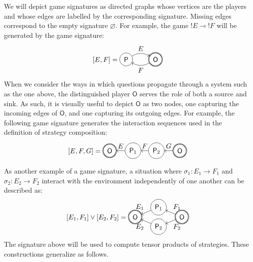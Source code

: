 \documentclass[sigplan,10pt,review,anonymous]{acmart}
\newcommand{\kw}[1]{\ensuremath{ \mathsf{#1} }}
\begin{document}
We will depict game signatures as directed graphs
whose vertices are the players and
whose edges are labelled by the corresponding signature.
Missing edges correspond to the empty signature $\varnothing$.
For example,
the game ${!E} \multimap {!F}$ will be generated by
the game signature:
\[
  [E,F] =
  \begin{tikzpicture}[baseline=(O.base),scale=1.5]
    \node[circle,draw,double] (O) at (0,0) {$\kw{O}$};
    \node[circle,draw] (P) at (-1,0) {$\kw{P}$};
    \path[->] (P) edge[bend left] node[above] {$E$} (O);
    \path[->] (O) edge[bend left] node[below] {$F$} (P);
  \end{tikzpicture}
\]
When we consider the ways in which questions propagate
through a system such as the one above,
the distinguished player $\kw{O}$ serves the role
of both a source and sink.
As such, it is visually useful
to depict $\kw{O}$ as two nodes,
one capturing the incoming edges of $\kw{O}$, and
one capturing its outgoing edges.
For example,
the following game signature
generates the interaction sequences
used in the definition of
strategy composition:
\[
  [E,F,G] =
  \begin{tikzpicture}[baseline=(O1.base),scale=1.2]
    \node[circle,double,draw] (O1) at (0,0) {$\kw{O}$};
    \node[circle,draw] (P1) at (-1,0) {$\kw{P}_2$};
    \node[circle,draw] (P2) at (-2,0) {$\kw{P}_1$};
    \node[circle,double,draw] (O2) at (-3,0) {$\kw{O}$};
    \path[->] (O1) edge node[above] {$G$} (P1);
    \path[->] (P1) edge node[above] {$F$} (P2);
    \path[->] (P2) edge node[above] {$E$} (O2);
  \end{tikzpicture}
\]

As another example of a game signature,
a situation where
$\sigma_1 : E_1 \rightarrow F_1$ and
$\sigma_2 : E_2 \rightarrow F_2$
interact with the environment
independently of one another
can be described as:
\[
  [E_1,F_1] \vee [E_2,F_2] =
  \begin{tikzpicture}[baseline=(O.base),xscale=1.2]
    \node[circle,draw,double] (O1) at (+1,0) {$\kw{O}$};
    \node[circle,draw,double] (O2) at (-1,0) {$\kw{O}$};
    \node[circle,draw] (P1) at (0,+0.5) {$\kw{P}_1$};
    \node[circle,draw] (P2) at (0,-0.5) {$\kw{P}_2$};
    \path[->] (O1) edge node[auto=right] {$F_1$} (P1);
    \path[->] (P1) edge node[auto=right] {$E_1$} (O2);
    \path[->] (O1) edge node[auto=left] {$F_2$} (P2);
    \path[->] (P2) edge node[auto=left] {$E_2$} (O2);
  \end{tikzpicture}
\]
The signature above will be used to compute
tensor products of strategies.
These constructions generalize as follows.
\end{document}
